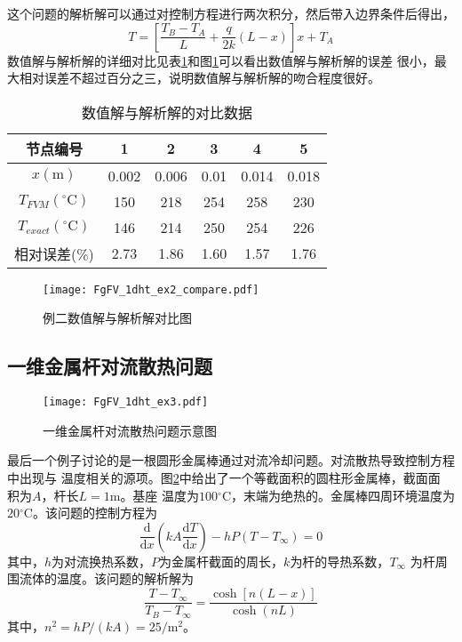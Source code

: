 这个问题的解析解可以通过对控制方程进行两次积分，然后带入边界条件后得出，
\begin{equation}
  T 
  =
  \left[
    \frac{T_{B}-T_{A}}{L}
    +
    \frac{q}{2k}(L-x)
  \right]x
  +
  T_{A}
\end{equation}
数值解与解析解的详细对比见表\ref{TbFV_ex2_compare}和图\ref{FgFV_1dht_ex2_compare}可以看出数值解与解析解的误差
很小，最大相对误差不超过百分之三，说明数值解与解析解的吻合程度很好。
\begin{table}[H]
  \begin{center}
  \caption{数值解与解析解的对比数据}
  \label{TbFV_ex2_compare}
  \begin{tabular}{|c|c|c|c|c|c|}
    \hline
    节点编号 & 1 & 2 & 3 & 4 & 5 \\
    \hline
    $x(\mathrm{m})$ & 0.002 & 0.006 & 0.01 & 0.014 & 0.018 \\
    \hline
    $T_{FVM}(^{\circ}\mathrm{C})$ & 150 & 218 & 254 & 258 & 230 \\
    \hline
    $T_{exact}(^{\circ}\mathrm{C})$ & 146 & 214 & 250 & 254 & 226 \\
    \hline
    相对误差(\%) & 2.73 & 1.86 & 1.60 & 1.57 & 1.76 \\
    \hline
  \end{tabular}
  \end{center}
\end{table}
\begin{figure}[H]
  \centering
  \texttt{[image: FgFV\_1dht\_ex2\_compare.pdf]}
  \caption{例二数值解与解析解对比图}
  \label{FgFV_1dht_ex2_compare}
\end{figure}

\subsection{一维金属杆对流散热问题}
\begin{figure}[h]
  \centering
  \texttt{[image: FgFV\_1dht\_ex3.pdf]}
  \caption{一维金属杆对流散热问题示意图}
  \label{FgFV_1dht_ex3}
\end{figure}
最后一个例子讨论的是一根圆形金属棒通过对流冷却问题。对流散热导致控制方程中出现与
温度相关的源项。图\ref{FgFV_1dht_ex3}中给出了一个等截面积的圆柱形金属棒，截面面
积为$A$，杆长$L=1\mathrm{m}$。基座
温度为$100\mathrm{^{\circ}C}$，末端为绝热的。金属棒四周环境温度为
$20\mathrm{^{\circ}C}$。该问题的控制方程为
\begin{equation}
  \frac{\mathrm{d}}{\mathrm{d}x}
  \left(
    kA\frac{\mathrm{d}T}{\mathrm{d}x}
  \right)
  -
  hP(T-T_{\infty})
  =
  0
  \label{EqFV_1dht_ex3_gov}
\end{equation}
其中，$h$为对流换热系数，$P$为金属杆截面的周长，$k$为杆的导热系数，$T_{\infty}$
为杆周围流体的温度。该问题的解析解为
\begin{equation}
  \frac{T-T_{\infty}}{T_{B}-T_{\infty}}
  =
  \frac{\cosh{[n(L-x)]}}{\cosh{(nL)}}
\end{equation}
其中，$n^{2}=hP/(kA)=25/{\mathrm{m^{2}}}$。

